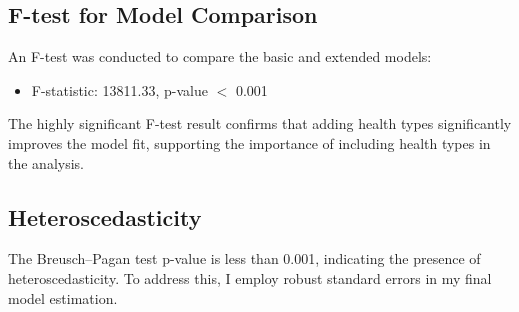 \subsection{F-test for Model Comparison}
An F-test was conducted to compare the basic and extended models:
\begin{itemize}
    \item F-statistic: 13811.33, p-value $<$ 0.001
\end{itemize}
The highly significant F-test result confirms that adding health types significantly improves the model fit, supporting the importance of including health types in the analysis.

\subsection{Heteroscedasticity}
The Breusch--Pagan test p-value is less than 0.001, indicating the presence of heteroscedasticity. To address this, I employ robust standard errors in my final model estimation.
